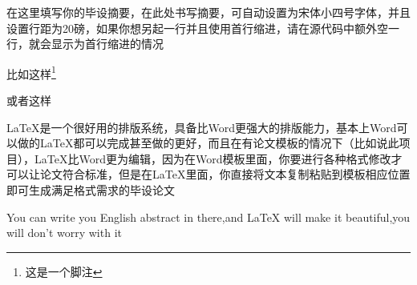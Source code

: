 \documentclass{NCEPUthesis}
\begin{document}


\distanceLogoTitle{2cm}%







\NCEPUcover%
\newpage
\NCEPUabstract

\begin{NCEPUabstracttext}
	在这里填写你的毕设摘要，在此处书写摘要，可自动设置为宋体小四号字体，并且设置行距为20磅，如果你想另起一行并且使用首行缩进，请在源代码中额外空一行，就会显示为首行缩进的情况
	
	比如这样\footnote{这是一个脚注}
	
	或者这样
	
	\LaTeX{}是一个很好用的排版系统，具备比Word更强大的排版能力，基本上Word可以做的\LaTeX{}都可以完成甚至做的更好，而且在有论文模板的情况下（比如说此项目），\LaTeX{}比Word更为编辑，因为在Word模板里面，你要进行各种格式修改才可以让论文符合标准，但是在\LaTeX{}里面，你直接将文本复制粘贴到模板相应位置即可生成满足格式需求的毕设论文
\end{NCEPUabstracttext}

\begin{NCEPUenabstract}%
	You can write you English abstract in there,and LaTeX will make it beautiful,you will don't worry with it
\end{NCEPUenabstract}
\tableofcontents%
\newpage
{}%
\newpage%


\end{document}
